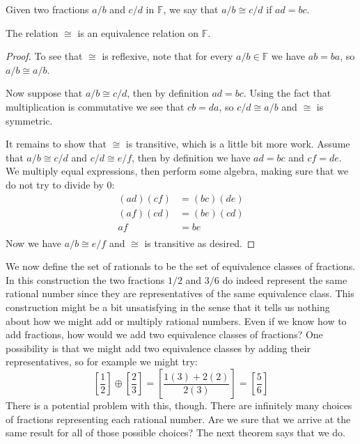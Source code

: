 \begin{definition}
Given two fractions $a/b$ and $c/d$ in $\mathbb F$, we say that $a/b\cong c/d$ if $ad=bc$.
\end{definition}

\begin{thrm}\label{thrm:rationals}
The relation $\cong$ is an equivalence relation on $\mathbb F$.
\end{thrm}

\begin{proof}
To see that $\cong$ is reflexive, note that for every $a/b\in\mathbb F$ we have $ab=ba$, so $a/b\cong a/b$.

Now suppose that $a/b\cong c/d$, then by definition $ad=bc$. Using the fact that multiplication is commutative we see that $cb=da$, so $c/d\cong a/b$ and $\cong$ is symmetric.

It remains to show that $\cong$ is transitive, which is a little bit more work. Assume that $a/b\cong c/d$ and $c/d\cong e/f$, then by definition we have $ad=bc$  and $cf=de$. We multiply equal expressions, then perform some algebra, making sure that we do not try to divide by $0$:
\begin{equation*}
\begin{split}
(ad)(cf)&=(bc)(de)\\
(af)(cd)&=(be)(cd)\\
af&=be\\
\end{split}
\end{equation*}
Now we have $a/b\cong e/f$ and $\cong$ is transitive as desired.
\end{proof}

We now define the set of rationals to be the set of equivalence classes of fractions. In this construction the two fractions $1/2$ and $3/6$ do indeed represent the same rational number since they are representatives of the same equivalence class. This construction might be a bit unsatisfying in the sense that it tells us nothing about how we might add or multiply rational numbers. Even if we know how to add fractions, how would we add two equivalence classes of fractions? One possibility is that we might add two equivalence classes by adding their representatives, so for example we might try: \[ \left[ \frac 12\right] \oplus \left[ \frac 23\right] =\left[ \frac{1(3)+2(2)}{2(3)}\right]=\left[ \frac 56\right] \] There is a potential problem with this, though. There are infinitely many choices of fractions representing each rational number. Are we sure that we arrive at the same result for all of those possible choices? The next theorem says that we do.

